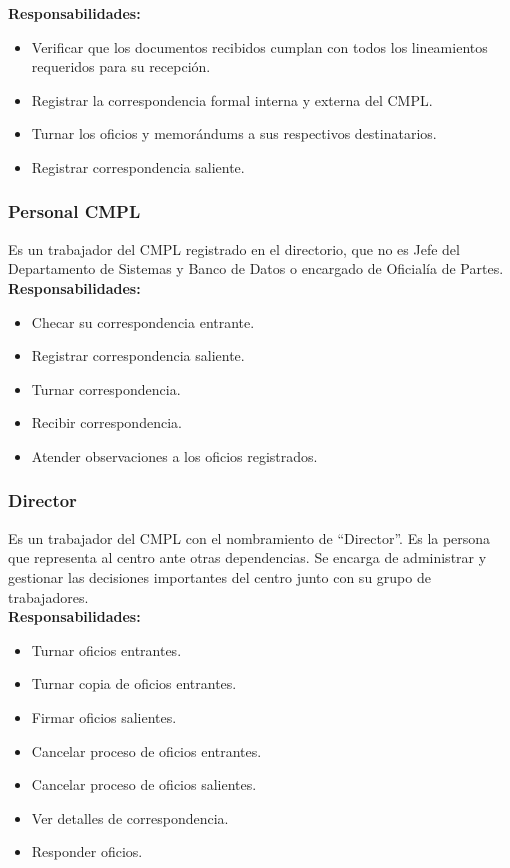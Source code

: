 \textbf{Responsabilidades:}
\begin{itemize}
	\item Verificar que los documentos recibidos cumplan con todos los lineamientos requeridos para su recepción.
	\item Registrar la correspondencia formal interna y externa del CMPL.
	\item Turnar los oficios y memorándums a sus respectivos destinatarios.
	\item Registrar correspondencia saliente.
\end{itemize}

\subsubsection{Personal CMPL}
Es un trabajador del CMPL registrado en el directorio, que no es Jefe del Departamento de Sistemas y Banco de Datos o encargado de Oficialía de Partes.\\

\textbf{Responsabilidades:}
\begin{itemize}
	\item Checar su correspondencia entrante.
	\item Registrar correspondencia saliente.
	\item Turnar correspondencia.
	\item Recibir correspondencia.
	\item Atender observaciones a los oficios registrados.
\end{itemize}

\subsubsection{Director}
Es un trabajador del CMPL con el nombramiento de “Director”. Es la persona que representa al centro ante otras dependencias. Se encarga de administrar y gestionar las decisiones importantes del centro junto con su grupo de trabajadores.\\

\textbf{Responsabilidades:}
\begin{itemize}
	\item Turnar oficios entrantes.
	\item Turnar copia de oficios entrantes.
	\item Firmar oficios salientes.
	\item Cancelar proceso de oficios entrantes.
	\item Cancelar proceso de oficios salientes.
	\item Ver detalles de correspondencia.
	\item Responder oficios.
\end{itemize}

